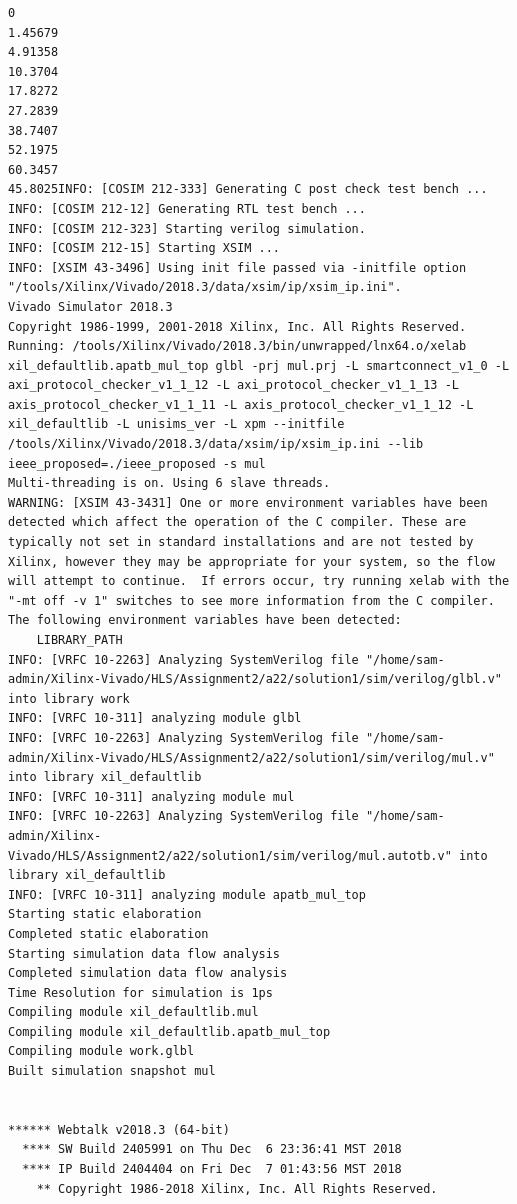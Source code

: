\documentclass{article}
\begin{document}
\begin{lstlisting}
0
1.45679
4.91358
10.3704
17.8272
27.2839
38.7407
52.1975
60.3457
45.8025INFO: [COSIM 212-333] Generating C post check test bench ...
INFO: [COSIM 212-12] Generating RTL test bench ...
INFO: [COSIM 212-323] Starting verilog simulation. 
INFO: [COSIM 212-15] Starting XSIM ...
INFO: [XSIM 43-3496] Using init file passed via -initfile option "/tools/Xilinx/Vivado/2018.3/data/xsim/ip/xsim_ip.ini".
Vivado Simulator 2018.3
Copyright 1986-1999, 2001-2018 Xilinx, Inc. All Rights Reserved.
Running: /tools/Xilinx/Vivado/2018.3/bin/unwrapped/lnx64.o/xelab xil_defaultlib.apatb_mul_top glbl -prj mul.prj -L smartconnect_v1_0 -L axi_protocol_checker_v1_1_12 -L axi_protocol_checker_v1_1_13 -L axis_protocol_checker_v1_1_11 -L axis_protocol_checker_v1_1_12 -L xil_defaultlib -L unisims_ver -L xpm --initfile /tools/Xilinx/Vivado/2018.3/data/xsim/ip/xsim_ip.ini --lib ieee_proposed=./ieee_proposed -s mul 
Multi-threading is on. Using 6 slave threads.
WARNING: [XSIM 43-3431] One or more environment variables have been detected which affect the operation of the C compiler. These are typically not set in standard installations and are not tested by Xilinx, however they may be appropriate for your system, so the flow will attempt to continue.  If errors occur, try running xelab with the "-mt off -v 1" switches to see more information from the C compiler. The following environment variables have been detected:
    LIBRARY_PATH
INFO: [VRFC 10-2263] Analyzing SystemVerilog file "/home/sam-admin/Xilinx-Vivado/HLS/Assignment2/a22/solution1/sim/verilog/glbl.v" into library work
INFO: [VRFC 10-311] analyzing module glbl
INFO: [VRFC 10-2263] Analyzing SystemVerilog file "/home/sam-admin/Xilinx-Vivado/HLS/Assignment2/a22/solution1/sim/verilog/mul.v" into library xil_defaultlib
INFO: [VRFC 10-311] analyzing module mul
INFO: [VRFC 10-2263] Analyzing SystemVerilog file "/home/sam-admin/Xilinx-Vivado/HLS/Assignment2/a22/solution1/sim/verilog/mul.autotb.v" into library xil_defaultlib
INFO: [VRFC 10-311] analyzing module apatb_mul_top
Starting static elaboration
Completed static elaboration
Starting simulation data flow analysis
Completed simulation data flow analysis
Time Resolution for simulation is 1ps
Compiling module xil_defaultlib.mul
Compiling module xil_defaultlib.apatb_mul_top
Compiling module work.glbl
Built simulation snapshot mul


****** Webtalk v2018.3 (64-bit)
  **** SW Build 2405991 on Thu Dec  6 23:36:41 MST 2018
  **** IP Build 2404404 on Fri Dec  7 01:43:56 MST 2018
    ** Copyright 1986-2018 Xilinx, Inc. All Rights Reserved.



\end{lstlisting}
\end{document}
